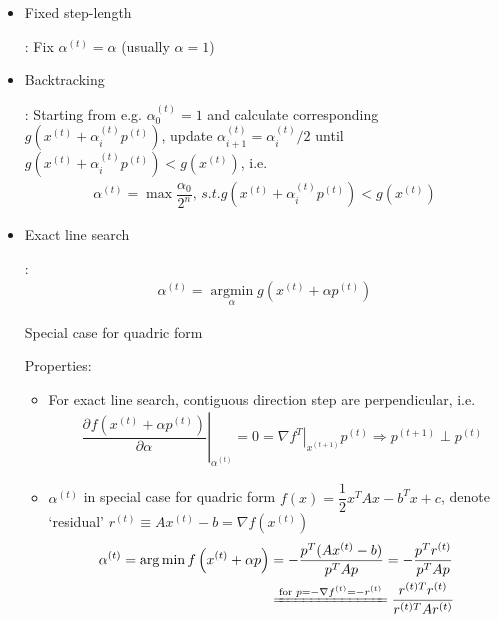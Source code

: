 \begin{itemize}[topsep=2pt,itemsep=0pt]
    \item \hypertarget{FixedStepLength}{Fixed step-length}: Fix $ \alpha ^{(t)}=\alpha  $ (usually $ \alpha =1 $)    
    \item \hypertarget{Backtracking}{Backtracking}: Starting from e.g. $ \alpha^{(t)}_0 =1 $ and calculate corresponding $ g\left(x^{(t)}+\alpha ^{(t)}_ip^{(t)}\right) $, update $ \alpha ^{(t)}_{i+1}=\alpha ^{(t)}_i/2 $ until $ g\left(x^{(t)}+\alpha ^{(t)}_ip^{(t)}\right)<g\left(x^{(t)}\right) $, i.e.
    \begin{align}
        \alpha ^{(t)}=\max  \dfrac{\alpha _0}{2^n},\,s.t. g\left(x^{(t)}+\alpha ^{(t)}_ip^{(t)}\right)<g\left(x^{(t)}\right)
    \end{align}
    \item \hypertarget{ExactLineSearch}{Exact line search}: 
    \begin{align}
        \alpha ^{(t)}=\mathop{\arg\min}\limits_{\alpha } g\left( x^{(t)}+\alpha p^{(t)} \right)  
    \end{align}

    Special case for quadric form $  $





    Properties: 
    \begin{itemize}[topsep=2pt,itemsep=0pt]
        \item For exact line search, contiguous direction step are perpendicular, i.e.
\begin{align}
    &\left.\dfrac{\partial^{} f\left(x^{(t)}+\alpha p^{(t)}\right)}{\partial \alpha ^{}}\right|_{\alpha ^{(t)}}=0=\left.\nabla f^T\right|_{x^{(t+1)}}p^{(t)}
    \Rightarrow p^{(t+1)}\perp p^{(t)}
\end{align}        
        \item $ \alpha ^{(t)} $ in special case for quadric form $ f(x)=\dfrac{1}{2}x^TAx-b^Tx+c $, denote `residual' $ r^{(t)}\equiv Ax^{(t)}-b=\nabla f\left(x^{(t)}\right) $
        \begin{align}
            \alpha ^{(t)}=\arg\min f\left( x^{(t)}+\alpha p \right)&=-\dfrac{p^T(Ax^{(t)}-b)}{p^TAp}=-\dfrac{p^Tr^{(t)}}{p^TAp}\\
            &\xlongequal{\text{for } p=-\nabla f^{(t)}=-r^{(t)}}\dfrac{r^{(t)T}r^{(t)}}{r^{(t)T}Ar^{(t)}}
        \end{align}
    \end{itemize}
    
    
    
\end{itemize}

